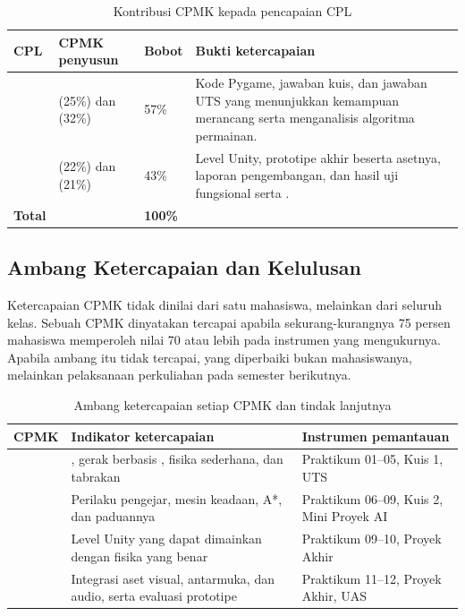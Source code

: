 \begin{table}[htbp]
\centering
\caption{Kontribusi CPMK kepada pencapaian CPL}
\label{tab:kontribusi-cpl}
{\setlength{\tabcolsep}{4pt}\footnotesize%
\begin{tabularx}{\textwidth}{@{}C{1.6cm} L{4.6cm} C{1.6cm} Y@{}}
\toprule
\headrow \textbf{CPL} & \textbf{CPMK penyusun} & \textbf{Bobot} & \textbf{Bukti ketercapaian} \\
\midrule
{} &  (25\%) dan  (32\%) & 57\% &
Kode Pygame, jawaban kuis, dan jawaban UTS yang menunjukkan kemampuan
merancang serta menganalisis algoritma permainan. \\
\addlinespace
{} &  (22\%) dan  (21\%) & 43\% &
Level Unity, prototipe akhir beserta asetnya, laporan pengembangan, dan hasil
uji fungsional serta . \\
\midrule
\textbf{Total} & & \textbf{100\%} & \\
\bottomrule
\end{tabularx}}
\end{table}

\subsection{Ambang Ketercapaian dan Kelulusan}

Ketercapaian CPMK tidak dinilai dari satu mahasiswa, melainkan dari seluruh
kelas. Sebuah CPMK dinyatakan tercapai apabila sekurang-kurangnya 75 persen
mahasiswa memperoleh nilai 70 atau lebih pada instrumen yang mengukurnya.
Apabila ambang itu tidak tercapai, yang diperbaiki bukan mahasiswanya,
melainkan pelaksanaan perkuliahan pada semester berikutnya.

\begin{table}[htbp]
\centering
\caption{Ambang ketercapaian setiap CPMK dan tindak lanjutnya}
\label{tab:ambang-cpmk}
{\setlength{\tabcolsep}{4pt}\footnotesize%
\begin{tabularx}{\textwidth}{@{}C{1.7cm} L{5.4cm} Y@{}}
\toprule
\headrow \textbf{CPMK} & \textbf{Indikator ketercapaian} & \textbf{Instrumen pemantauan} \\
\midrule
{} & , gerak berbasis , fisika
sederhana, dan tabrakan & Praktikum 01--05, Kuis 1, UTS \\
\addlinespace
{} & Perilaku pengejar, mesin keadaan, A*, dan paduannya &
Praktikum 06--09, Kuis 2, Mini Proyek AI \\
\addlinespace
{} & Level Unity yang dapat dimainkan dengan fisika yang benar &
Praktikum 09--10, Proyek Akhir \\
\addlinespace
{} & Integrasi aset visual, antarmuka, dan audio, serta evaluasi
prototipe & Praktikum 11--12, Proyek Akhir, UAS \\
\bottomrule
\end{tabularx}}
\end{table}

